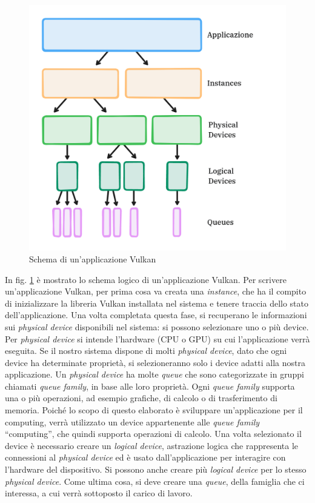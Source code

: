 \begin{figure}[ht]
    \centering
    \includegraphics[width=.9\linewidth]{images/chapter2/vulkan_scheme.png}
    \caption{Schema di un'applicazione Vulkan}
    \label{fig:vulkan_scheme}
\end{figure}

In fig. \ref{fig:vulkan_scheme} è mostrato lo schema logico di un'applicazione Vulkan. 
Per scrivere un'applicazione Vulkan, per prima cosa va creata una \textit{instance}, che ha il compito di inizializzare la libreria Vulkan installata nel sistema e tenere traccia dello stato dell'applicazione. Una volta completata questa fase, si recuperano le informazioni sui \textit{physical device} disponibili nel sistema: si possono selezionare uno o più device. Per \textit{physical device} si intende l'hardware (CPU o GPU) su cui l'applicazione verrà eseguita. Se il nostro sistema dispone di molti \textit{physical device}, dato che ogni device ha determinate proprietà, si selezioneranno solo i device adatti alla nostra applicazione. Un \textit{physical device} ha molte \textit{queue} che sono categorizzate in gruppi chiamati \textit{queue family}, in base alle loro proprietà. Ogni \textit{queue family} supporta una o più operazioni, ad esempio grafiche, di calcolo o di trasferimento di memoria. Poiché lo scopo di questo elaborato è sviluppare un'applicazione per il computing, verrà utilizzato un device appartenente alle \textit{queue family} ``computing'', che quindi supporta operazioni di calcolo. Una volta selezionato il device è necessario creare un \textit{logical device}, astrazione logica che rappresenta le connessioni al \textit{physical device} ed è usato dall'applicazione per interagire con l'hardware del dispositivo. Si possono anche creare più \textit{logical device} per lo stesso \textit{physical device}. Come ultima cosa, si deve creare una \textit{queue}, della famiglia che ci interessa, a cui verrà sottoposto il carico di lavoro.

